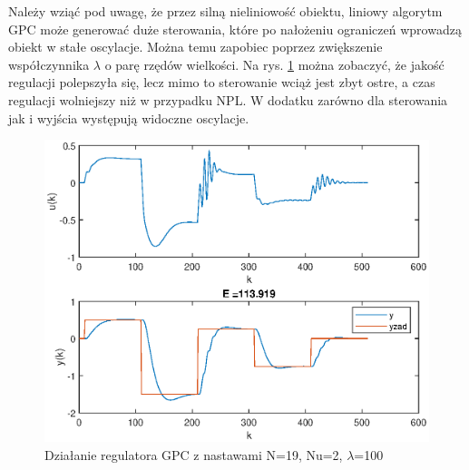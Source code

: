 		\newpage
		Należy wziąć pod uwagę, że przez silną nieliniowość obiektu, liniowy algorytm GPC może generować duże sterowania, które po nałożeniu ograniczeń wprowadzą obiekt w stałe oscylacje. Można temu zapobiec poprzez zwiększenie współczynnika $\lambda$ o parę rzędów wielkości. Na rys. \ref{fig:GPC100} można zobaczyć, że jakość regulacji polepszyła się, lecz mimo to sterowanie wciąż jest zbyt ostre, a czas regulacji wolniejszy niż w przypadku NPL. W dodatku zarówno dla sterowania jak i wyjścia występują widoczne oscylacje.
		
		\begin{figure}[h!]
			\centering
			\includegraphics[width=\linewidth]{img/strojenieGPC_N_19_Nu_2_lam_100.eps}
			\caption{Działanie regulatora GPC z nastawami N=19, Nu=2, $\lambda$=100}
			\label{fig:GPC100}
		\end{figure}